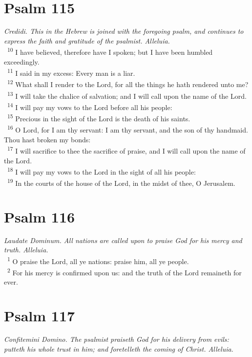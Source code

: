 \documentclass[a5paper,12pt]{article}
\begin{document}
\begin{multicols*}{2}
\section{Psalm 115}
\label{sec:org9bbfa08}
\emph{Credidi. This in the Hebrew is joined with the foregoing psalm, and continues to express the faith and gratitude of the psalmist. Alleluia.}\\

~\textsuperscript{10} I have believed, therefore have I spoken; but I have been humbled exceedingly.\\
~\textsuperscript{11} I said in my excess: Every man is a liar.\\
~\textsuperscript{12} What shall I render to the Lord, for all the things he hath rendered unto me?\\
~\textsuperscript{13} I will take the chalice of salvation; and I will call upon the name of the Lord.\\
~\textsuperscript{14} I will pay my vows to the Lord before all his people:\\
~\textsuperscript{15} Precious in the sight of the Lord is the death of his saints.\\
~\textsuperscript{16} O Lord, for I am thy servant: I am thy servant, and the son of thy handmaid. Thou hast broken my bonds:\\
~\textsuperscript{17} I will sacrifice to thee the sacrifice of praise, and I will call upon the name of the Lord.\\
~\textsuperscript{18} I will pay my vows to the Lord in the sight of all his people:\\
~\textsuperscript{19} In the courts of the house of the Lord, in the midst of thee, O Jerusalem.\\

\section{Psalm 116}
\label{sec:orga963858}
\emph{Laudate Dominum. All nations are called upon to praise God for his mercy and truth. Alleluia.}\\

~\textsuperscript{1} O praise the Lord, all ye nations: praise him, all ye people.\\
~\textsuperscript{2} For his mercy is confirmed upon us: and the truth of the Lord remaineth for ever.\\

\section{Psalm 117}
\label{sec:org1b0dadf}
\emph{Confitemini Domino. The psalmist praiseth God for his delivery from evils: putteth his whole trust in him; and foretelleth the coming of Christ. Alleluia.}\\


\end{multicols*}
\end{document}
